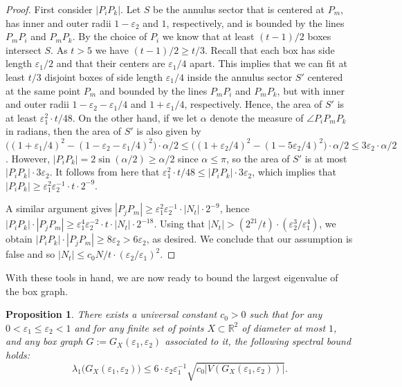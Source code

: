 \documentclass[12pt]{article}
\newtheorem{prop}[thm]{Proposition}
\newcommand{\eps}{\varepsilon}
\begin{document}
\begin{proof}
First consider $|P_iP_k|$. Let $S$ be the annulus  sector that is centered at $P_m$, has inner and outer radii $1-\eps_2$ and $1$, respectively, and is bounded by the lines $P_mP_i$ and $P_m 
P_k$. By the choice of $P_i$ we know that at least $(t-1)/2$ boxes intersect $S$. As $t>5$ we have $(t-1)/2\ge t/3$. Recall that each box has side length $\eps_1/2$ and that their centers are $\eps_1/4$ apart. This implies that we can fit at least $t/3$ disjoint boxes of side length $\eps_1/4$ inside the annulus sector $S'$ centered at the same point $P_m$ and bounded by the lines $P_mP_i$ and $P_mP_k$, but with inner and outer radii $1-\eps_2-\eps_1/4$ and $1+\eps_1/4$, respectively. Hence, the area of $S'$ is at least $\eps_1^2\cdot t/48$. 
On the other hand, if we let $\alpha$ denote the measure of $\angle P_iP_mP_k$ in radians, then the area of $S'$ is also given by $\big((1+\eps_1/4)^2-(1-\eps_2-\eps_1/4)^2\big)\cdot\alpha/2\leq \big((1+\eps_2/4)^2-(1-5\eps_2/4)^2\big)\cdot\alpha/2\leq 3\eps_2\cdot \alpha/2$. However, $|P_iP_k|=2\sin(\alpha/2)\geq \alpha/2$ since $\alpha\leq \pi$, so the area of $S'$ is at most $|P_iP_k|\cdot 3\eps_2$. It follows from here that  $\eps_1^2\cdot t/48\le|P_iP_k|\cdot 3 \eps_2$, which implies that $|P_iP_k|\ge\eps_1^2\eps_2^{-1}\cdot t\cdot2^{-9}$.

 A similar argument gives $|P_jP_m|\ge\eps_1^2\eps_2^{-1}\cdot |N_t|\cdot 2^{-9}$, hence $|P_iP_k|\cdot |P_jP_m|\ge\eps_1^4\eps_2^{-2}\cdot t\cdot|N_t|\cdot 2^{-18}$. Using that $|N_t|> (2^{21}/t)\cdot (\eps_2^3/\eps_1^4)$, we obtain $|P_iP_k|\cdot |P_jP_m|\ge 8 \eps_2>6\eps_2$, as desired. We conclude that our assumption is false and so $|N_t|\leq c_0N/t\cdot (\eps_2/\eps_1)^2$.
\end{proof}

With these tools in hand, we are now ready to bound the largest eigenvalue of the box graph.

\begin{prop}\label{prop:sqrt-control}
    There exists a universal constant $c_0>0$ such that for any  $0<\eps_1\leq \eps_2<1$ and for any finite set of points $X\subset \mathbb{R}^2$ of diameter at most $1$, and any box graph $G:=G_X(\eps_1,\eps_2)$ associated to it, the following spectral bound holds:$$\lambda_1\big(G_X(\eps_1,\eps_2)\big)\leq 6\cdot\eps_{2 } \eps_1^{-1}\sqrt{c_0|V(G_X(\eps_1,\eps_2))|}.$$ 
\end{prop}
\end{document}
